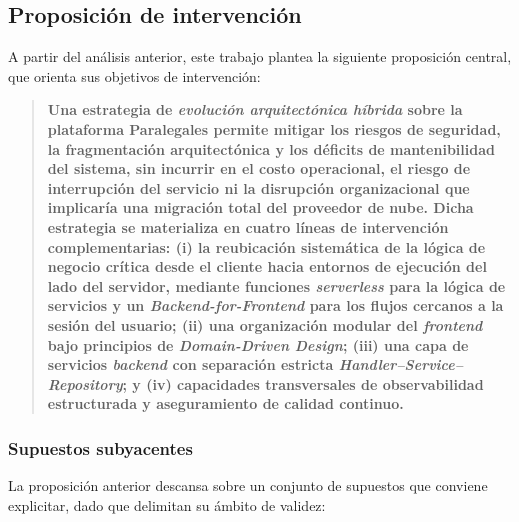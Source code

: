 \subsection{Proposición de intervención}

A partir del análisis anterior, este trabajo plantea la siguiente proposición central, que orienta sus objetivos de intervención:

\begin{quote}
  \textbf{Una estrategia de \textit{evolución arquitectónica híbrida} sobre la plataforma Paralegales permite mitigar los riesgos de seguridad, la fragmentación arquitectónica y los déficits de mantenibilidad del sistema, sin incurrir en el costo operacional, el riesgo de interrupción del servicio ni la disrupción organizacional que implicaría una migración total del proveedor de nube. Dicha estrategia se materializa en cuatro líneas de intervención complementarias: (i) la reubicación sistemática de la lógica de negocio crítica desde el cliente hacia entornos de ejecución del lado del servidor, mediante funciones \textit{serverless} para la lógica de servicios y un \textit{Backend-for-Frontend} para los flujos cercanos a la sesión del usuario; (ii) una organización modular del \textit{frontend} bajo principios de \textit{Domain-Driven Design}; (iii) una capa de servicios \textit{backend} con separación estricta \textit{Handler--Service--Repository}; y (iv) capacidades transversales de observabilidad estructurada y aseguramiento de calidad continuo.}
\end{quote}

\subsubsection*{Supuestos subyacentes}

La proposición anterior descansa sobre un conjunto de supuestos que conviene explicitar, dado que delimitan su ámbito de validez:

